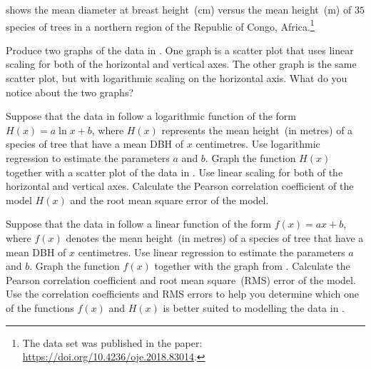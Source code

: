 \documentclass[a4paper,oneside,12pt]{article}
\begin{document}
\begin{exercise}
 shows the mean diameter at breast
height~(cm) versus the mean height~(m) of $35$ species of trees in a
northern region of the Republic of Congo, Africa.\footnote{
  The data set was published in the paper:
  \url{https://doi.org/10.4236/oje.2018.83014}.
}
\begin{packedenum}
\item\label{subex:logarithm:Sombo_graph_linear_log}
  Produce two graphs of the data in .  One
  graph is a scatter plot that uses linear scaling for both of the
  horizontal and vertical axes.  The other graph is the same scatter
  plot, but with logarithmic scaling on the horizontal axis.  What do
  you notice about the two graphs?

\item\label{subex:logarithm:Sombo_log_regression}
  Suppose that the data in  follow a
  logarithmic function of the form $H(x) = a \ln x + b$, where $H(x)$
  represents the mean height~(in metres) of a species of tree that
  have a mean DBH of $x$ centimetres.  Use logarithmic regression to
  estimate the parameters $a$ and $b$.  Graph the function $H(x)$
  together with a scatter plot of the data in
  .  Use linear scaling for both of the
  horizontal and vertical axes.  Calculate the Pearson correlation
  coefficient of the model $H(x)$ and the root mean square error of
  the model.

\item\label{subex:logarithm:Sombo_linear_regression}
  Suppose that the data in  follow a
  linear function of the form $f(x) = ax + b$, where $f(x)$ denotes
  the mean height~(in metres) of a species of tree that have a mean
  DBH of $x$ centimetres.  Use linear regression to estimate the
  parameters $a$ and $b$.  Graph the function $f(x)$ together with the
  graph from .  Calculate
  the Pearson correlation coefficient and root mean square~(RMS) error
  of the model.  Use the correlation coefficients and RMS errors to
  help you determine which one of the functions $f(x)$ and $H(x)$ is
  better suited to modelling the data in .
\end{packedenum}
\end{exercise}
\end{document}
